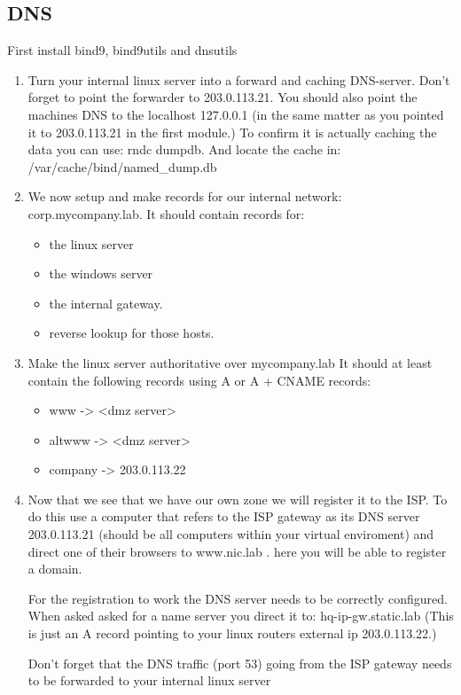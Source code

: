 \documentclass[paper=a4, fontsize=11pt]{report} %
\begin{document}
\subsection{DNS}
First install bind9, bind9utils and dnsutils
\begin{enumerate}
	\item Turn your internal linux server into a forward and caching DNS-server.  Don’t forget to point the forwarder to 203.0.113.21. You should also point the machines DNS to the localhost 127.0.0.1 (in the same matter as you pointed it to 203.0.113.21 in the first module.)
		To confirm it is actually caching the data you can use: rndc dumpdb. And locate the cache in: /var/cache/bind/named\_dump.db
	\item We now setup and make records for our internal network: corp.mycompany.lab. It  should contain records for:
		\begin{itemize}
			\item the linux server
			\item the windows server
			\item the internal gateway.
			\item reverse lookup for those hosts.
		\end{itemize}
		\item Make the linux server authoritative over mycompany.lab It should at least contain the following records using A or A + CNAME records:
			\begin{itemize}
				\item www -> <dmz server>
				\item altwww -> <dmz server>
				\item company -> 203.0.113.22
			\end{itemize}
		\item Now that we see that we have our own zone we will register it to the ISP. To do this use a computer that refers to the ISP gateway as its DNS server 203.0.113.21 (should be all computers within your virtual enviroment) and direct one of their browsers to www.nic.lab . here you will be able to register a domain.
			
			For the registration to work the DNS server needs to be correctly configured. When asked asked for a name server you direct it to: hq-ip-gw.static.lab (This is just an A record pointing to your linux routers external ip 203.0.113.22.)
			
			Don’t forget that the DNS traffic (port 53) going from the ISP gateway needs to be forwarded to your internal linux server
\end{enumerate}
\end{document}
